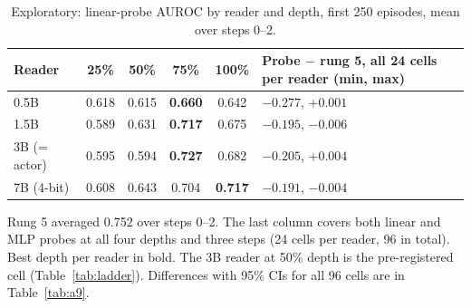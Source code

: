 \begin{table}[htbp]
\centering\small
\caption{Exploratory: linear-probe AUROC by reader and depth, first 250 episodes, mean over steps 0--2.}\label{tab:a6}
\begin{tabularx}{\linewidth}{@{}lccccL@{}}
\toprule
Reader & 25\% & 50\% & 75\% & 100\% & Probe $-$ rung 5, all 24 cells per reader (min, max) \\
\midrule
0.5B & 0.618 & 0.615 & \textbf{0.660} & 0.642 & $-0.277$, $+0.001$ \\
1.5B & 0.589 & 0.631 & \textbf{0.717} & 0.675 & $-0.195$, $-0.006$ \\
3B (= actor) & 0.595 & 0.594 & \textbf{0.727} & 0.682 & $-0.205$, $+0.004$ \\
7B (4-bit) & 0.608 & 0.643 & 0.704 & \textbf{0.717} & $-0.191$, $-0.004$ \\
\bottomrule
\end{tabularx}
\par\smallskip\raggedright\footnotesize
Rung 5 averaged 0.752 over steps 0--2. The last column covers both linear and MLP probes at all four depths and three steps (24 cells per reader, 96 in total). Best depth per reader in bold. The 3B reader at 50\% depth is the pre-registered cell (Table~\ref{tab:ladder}). Differences with 95\% CIs for all 96 cells are in Table~\ref{tab:a9}.
\end{table}
